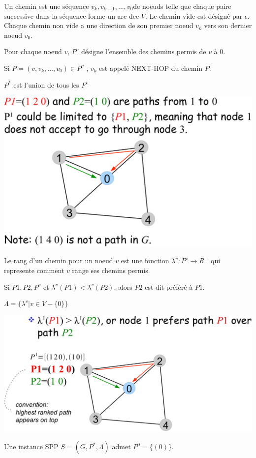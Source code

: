 \documentclass{article}
\begin{document}
\begin{sffamily}
Un chemin est une séquence $v_k, v_{k-1}, \dots, v_0$de noeuds telle
que chaque paire successive dans la séquence forme un arc dee $V$. Le
chemin vide est désigné par $\epsilon$. Chaque chemin non vide a une
direction de son premier noeud $v_k$ vers son dernier noeud $v_0$.

Pour chaque noeud $v$, $P^v$ désigne l'ensemble des chemins permis de
$v$ à $0$.

Si $P = (v, v_k, \dots, v_0) \in P^v$ , $v_k$ est appelé NEXT-HOP du
chemin $P$.

$P^*$ est l'union de tous les $P^v$

\includegraphics[width=\textwidth]{fab_014.pdf}

Le rang d'un chemin pour un noeud $v$ est une fonction $\lambda^v :
P^v \rightarrow R^+$ qui represente comment $v$ range ses chemins
permis.

Si $P1, P2, P^v$ et $\lambda^v(P1) < \lambda^v(P2)$, alors $P2$ est
dit préféré à $P1$.

$\Lambda = \{\lambda^v | v \in V-\{0\}\}$

\includegraphics[width=\textwidth]{fab_015.pdf}

Une instance SPP $S = (G, P^*, \Lambda)$ admet $P^0=\{(0)\}$.


\end{sffamily}
\end{document}
